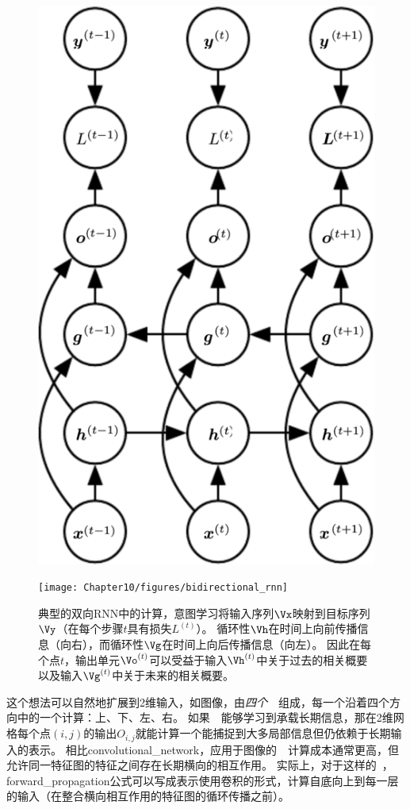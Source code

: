 \begin{figure}[!htb]
\ifOpenSource
\centerline{\includegraphics[scale=0.5]{images/99.png}}
\else
\centerline{\texttt{[image: Chapter10/figures/bidirectional\_rnn]}}
\fi
\caption{典型的双向\gls{RNN}中的计算，意图学习将输入序列$\Vx$映射到目标序列$\Vy$（在每个步骤$t$具有损失$L^{(t)}$）。
循环性$\Vh$在时间上向前传播信息（向右），而循环性$\Vg$在时间上向后传播信息（向左）。
因此在每个点$t$，输出单元$\Vo^{(t)}$可以受益于输入$\Vh^{(t)}$中关于过去的相关概要以及输入$\Vg^{(t)}$中关于未来的相关概要。
}
\label{fig:chap10_bidirectional_rnn}
\end{figure}

这个想法可以自然地扩展到2维输入，如图像，由\emph{四个}~~组成，每一个沿着四个方向中的一个计算：上、下、左、右。
如果~~能够学习到承载长期信息，那在2维网格每个点$(i, j)$的输出$O_{i,j}$就能计算一个能捕捉到大多局部信息但仍依赖于长期输入的表示。
相比\gls{convolutional_network}，应用于图像的~~计算成本通常更高，但允许同一特征图的特征之间存在长期横向的相互作用\citep{Visin-et-al-arxiv2015-renet,kalchbrenner2015grid}。
实际上，对于这样的~，\gls{forward_propagation}公式可以写成表示使用卷积的形式，计算自底向上到每一层的输入（在整合横向相互作用的特征图的循环传播之前）。

